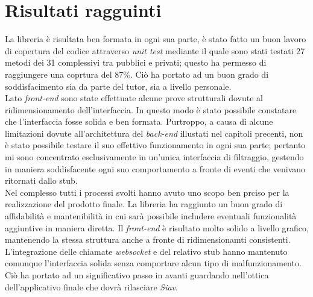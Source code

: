 \section{Risultati ragguinti}
La libreria è risultata ben formata in ogni sua parte, è stato fatto un buon lavoro di copertura del codice attraverso \textit{\gls{unit test}} mediante il quale sono stati testati 27 metodi dei 31 complessivi tra pubblici e privati; questo ha permesso di raggiungere una coprtura del 87\%. Ciò ha portato ad un buon grado di soddisfacimento sia da parte del tutor, sia a livello personale.\\
Lato \textit{front-end} sono state effettuate alcune prove strutturali dovute al ridimensionamento dell'interfaccia. In questo modo è stato possibile constatare che l'interfaccia fosse solida e ben formata. Purtroppo, a causa di alcune limitazioni dovute all'architettura del \textit{back-end} illustati nel capitoli precenti, non è stato possibile testare il suo effettivo funzionamento in ogni sua parte; pertanto mi sono concentrato esclusivamente in un'unica interfaccia di filtraggio, gestendo in maniera soddisfacente ogni suo comportamento a fronte di eventi che venivano ritornati dallo stub.\\
Nel complesso tutti i processi svolti hanno avuto uno scopo ben prciso per la realizzazione del prodotto finale. La libreria ha raggiunto un buon grado di affidabilità e mantenibilità in cui sarà possibile includere eventuali funzionalità aggiuntive in maniera diretta. Il \textit{front-end} è risultato molto solido a livello grafico, mantenendo la stessa struttura anche a fronte di ridimensionamti consistenti. L'integrazione delle chiamate \textit{websocket} e del relativo stub hanno mantenuto comunque l'interfaccia solida senza comportare alcun tipo di malfunzionamento. Ciò ha portato ad un significativo passo in avanti guardando nell'ottica dell'applicativo finale che dovrà rilasciare \textit{Siav}.